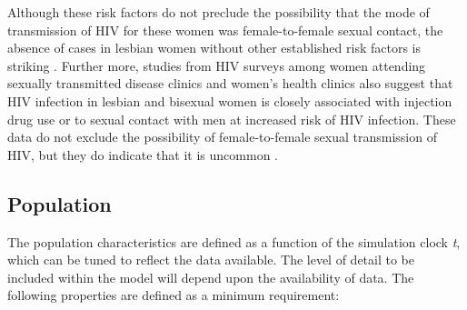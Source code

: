 Although these risk factors do not preclude the possibility that the mode of transmission
of HIV for these women was female-to-female sexual contact, the absence of cases in
lesbian women without other established risk factors is striking \cite{Monzon1987}.
Further more, studies from HIV surveys among women attending sexually transmitted disease
clinics and women's health clinics also suggest that HIV infection in lesbian and
bisexual women is closely associated with injection drug use or to sexual contact with
men at increased risk of HIV infection. These data do not exclude the possibility of
female-to-female sexual transmission of HIV, but they do indicate that it is uncommon
\cite{Chu1994}.

\subsection{Population}

The population characteristics are defined as a function of the simulation clock
\emph{t}, which can be tuned to reflect the data available. The level of detail to be
included within the model will depend upon the availability of data. The following
properties are defined as a minimum requirement:

